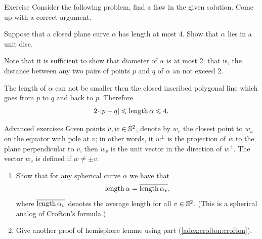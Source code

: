 \begin{thm}{Exercise}\label{ex:flaw}
Consider the following problem, find a flaw in the given solution.
Come up with a correct argument.
\end{thm}

 
Suppose that a closed plane curve $\alpha$ has length at most 4.
Show that $\alpha$ lies in a unit disc.

Note that it is sufficient to show that diameter of $\alpha$ is at most 2;
that is, the distance between any two pairs of points $p$ and $q$ of $\alpha$ an not exceed $2$.

The length of $\alpha$ can not be smaller then the closed inscribed polygonal line which goes from $p$ to $q$ and back to $p$.
Therefore 
\[2\cdot |p-q|\le\length \alpha\le 4.\]
\qedsf

\begin{thm}{Advanced exercises} \label{adex:crofton}
Given points $v,w\in\mathbb{S}^2$, denote by $w_v$ the closest point to $w_u$ on the equator with pole at $v$;
in other words, it $w^\perp$ is the projection of $w$ to the plane perpendicular to $v$, then $w_v$ is the unit vector in the direction of $w^\perp$.
The vector $w_v$ is defined if $w\ne\pm v$.

\begin{enumerate}
\item \label{adex:crofton:crofton}
Show that for any spherical curve $\alpha$ we have that
\[\mathop{\rm length}\nolimits\alpha=\overline{\mathop{\rm length}\nolimits\alpha_v},\]
where $\overline{\mathop{\rm length}\nolimits\alpha_v}$ denotes the average length for all $v\in \mathbb{S}^2$.
(This is a spherical analog of Crofton's formula.)
\item\label{adex:crofton:hemisphere} Give another proof of hemisphere lemme using part (\ref{adex:crofton:crofton}). 
\end{enumerate}
 
\end{thm}

